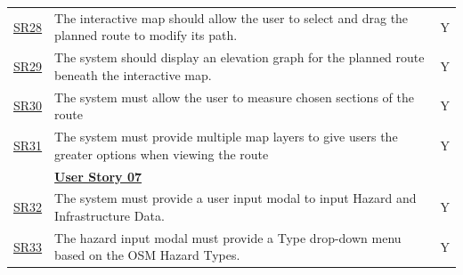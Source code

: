 \begin{table}[!htb]
\begin{tabularx}{\textwidth}{ p{1cm} p{11cm} p{1cm} }
        \hyperref[SR:28]{SR28} & The interactive map should allow the user to select and drag the planned route to modify its path. & Y\\ 
        \hyperref[SR:29]{SR29} & The system should display an elevation graph for the planned route beneath the interactive map. & Y\\
        \hyperref[SR:30]{SR30} & The system must allow the user to measure chosen sections of the route & Y\\
        \hyperref[SR:31]{SR31} & The system must provide multiple map layers to give users the greater options when viewing the route & Y\\ 
        \hline
        & \textbf{\hyperref[tab:user-story-07]{User Story 07}}  \\
        \hyperref[SR:32]{SR32} & The system must provide a user input modal to input Hazard and Infrastructure Data. & Y \\
        \hyperref[SR:33]{SR33} & The hazard input modal must provide a Type drop-down menu based on the OSM Hazard Types. & Y\\
    \end{tabularx}
\end{table}
\clearpage

